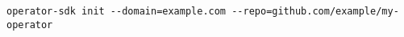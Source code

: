 \begin{verbatim}
operator-sdk init --domain=example.com --repo=github.com/example/my-operator
\end{verbatim}